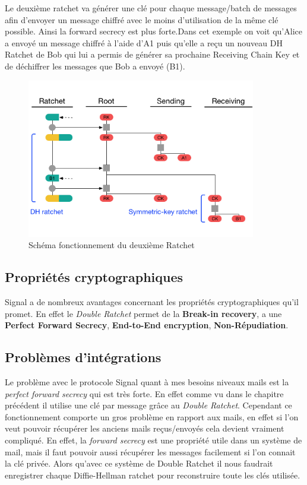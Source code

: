 Le deuxième ratchet va générer une clé pour chaque message/batch de messages afin d'envoyer un message chiffré avec le moins d'utilisation de la même clé possible. Ainsi la forward secrecy est plus forte.Dans cet exemple on voit qu'Alice a envoyé un message chiffré à l'aide d'A1 puis qu'elle a reçu un nouveau DH Ratchet de Bob qui lui a permis de générer sa prochaine Receiving Chain Key et de déchiffrer les messages que Bob a envoyé (B1).
\begin{figure}[h!]
	\centering
	\includegraphics[width=10cm]{images/secondRatchet.png}
	\caption{Schéma fonctionnement du deuxième Ratchet\cite{doubleratchet}}
	\label{fig:signalSecond}
\end{figure}
\subsection{Propriétés cryptographiques}
Signal a de nombreux avantages concernant les propriétés cryptographiques qu'il promet. En effet le \textit{Double Ratchet} permet de la \textbf{Break-in recovery}, a une \textbf{Perfect Forward Secrecy}, \textbf{End-to-End encryption}, \textbf{Non-Répudiation}.
\subsection{Problèmes d'intégrations}
Le problème avec le protocole Signal quant à mes besoins niveaux mails est la \textit{perfect forward secrecy} qui est très forte. En effet comme vu dans le chapitre précédent il utilise une clé par message grâce au \textit{Double Ratchet}. Cependant ce fonctionnement comporte un gros problème en rapport aux mails, en effet si l'on veut pouvoir récupérer les anciens mails reçus/envoyés cela devient vraiment compliqué. En effet, la \textit{forward secrecy} est une propriété utile dans un système de mail, mais il faut pouvoir aussi récupérer les messages facilement si l'on connait la clé privée. Alors qu'avec ce système de Double Ratchet il nous faudrait enregistrer chaque Diffie-Hellman ratchet pour reconstruire toute les clés utilisée.
